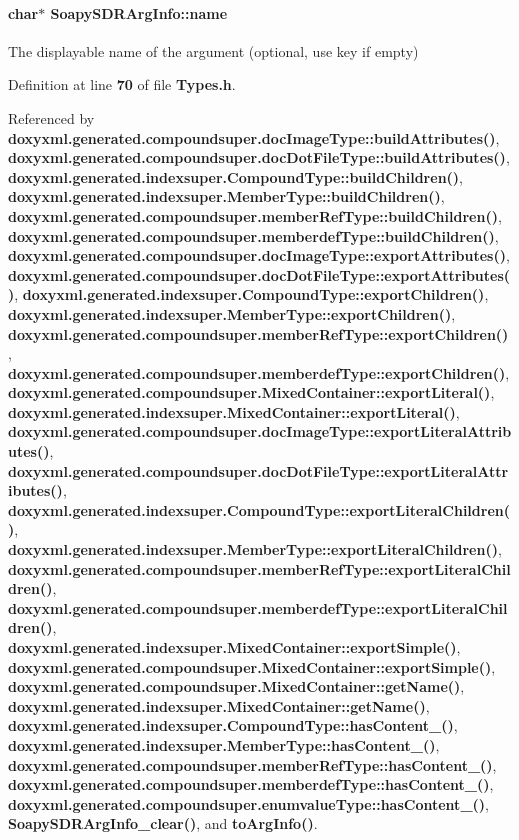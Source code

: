 \paragraph[{name}]{\setlength{\rightskip}{0pt plus 5cm}char$\ast$ Soapy\+S\+D\+R\+Arg\+Info\+::name}\label{structSoapySDRArgInfo_a0049552f36c64e041654b724eb57955c}


The displayable name of the argument (optional, use key if empty) 



Definition at line {\bf 70} of file {\bf Types.\+h}.



Referenced by {\bf doxyxml.\+generated.\+compoundsuper.\+doc\+Image\+Type\+::build\+Attributes()}, {\bf doxyxml.\+generated.\+compoundsuper.\+doc\+Dot\+File\+Type\+::build\+Attributes()}, {\bf doxyxml.\+generated.\+indexsuper.\+Compound\+Type\+::build\+Children()}, {\bf doxyxml.\+generated.\+indexsuper.\+Member\+Type\+::build\+Children()}, {\bf doxyxml.\+generated.\+compoundsuper.\+member\+Ref\+Type\+::build\+Children()}, {\bf doxyxml.\+generated.\+compoundsuper.\+memberdef\+Type\+::build\+Children()}, {\bf doxyxml.\+generated.\+compoundsuper.\+doc\+Image\+Type\+::export\+Attributes()}, {\bf doxyxml.\+generated.\+compoundsuper.\+doc\+Dot\+File\+Type\+::export\+Attributes()}, {\bf doxyxml.\+generated.\+indexsuper.\+Compound\+Type\+::export\+Children()}, {\bf doxyxml.\+generated.\+indexsuper.\+Member\+Type\+::export\+Children()}, {\bf doxyxml.\+generated.\+compoundsuper.\+member\+Ref\+Type\+::export\+Children()}, {\bf doxyxml.\+generated.\+compoundsuper.\+memberdef\+Type\+::export\+Children()}, {\bf doxyxml.\+generated.\+compoundsuper.\+Mixed\+Container\+::export\+Literal()}, {\bf doxyxml.\+generated.\+indexsuper.\+Mixed\+Container\+::export\+Literal()}, {\bf doxyxml.\+generated.\+compoundsuper.\+doc\+Image\+Type\+::export\+Literal\+Attributes()}, {\bf doxyxml.\+generated.\+compoundsuper.\+doc\+Dot\+File\+Type\+::export\+Literal\+Attributes()}, {\bf doxyxml.\+generated.\+indexsuper.\+Compound\+Type\+::export\+Literal\+Children()}, {\bf doxyxml.\+generated.\+indexsuper.\+Member\+Type\+::export\+Literal\+Children()}, {\bf doxyxml.\+generated.\+compoundsuper.\+member\+Ref\+Type\+::export\+Literal\+Children()}, {\bf doxyxml.\+generated.\+compoundsuper.\+memberdef\+Type\+::export\+Literal\+Children()}, {\bf doxyxml.\+generated.\+indexsuper.\+Mixed\+Container\+::export\+Simple()}, {\bf doxyxml.\+generated.\+compoundsuper.\+Mixed\+Container\+::export\+Simple()}, {\bf doxyxml.\+generated.\+compoundsuper.\+Mixed\+Container\+::get\+Name()}, {\bf doxyxml.\+generated.\+indexsuper.\+Mixed\+Container\+::get\+Name()}, {\bf doxyxml.\+generated.\+indexsuper.\+Compound\+Type\+::has\+Content\+\_\+()}, {\bf doxyxml.\+generated.\+indexsuper.\+Member\+Type\+::has\+Content\+\_\+()}, {\bf doxyxml.\+generated.\+compoundsuper.\+member\+Ref\+Type\+::has\+Content\+\_\+()}, {\bf doxyxml.\+generated.\+compoundsuper.\+memberdef\+Type\+::has\+Content\+\_\+()}, {\bf doxyxml.\+generated.\+compoundsuper.\+enumvalue\+Type\+::has\+Content\+\_\+()}, {\bf Soapy\+S\+D\+R\+Arg\+Info\+\_\+clear()}, and {\bf to\+Arg\+Info()}.


